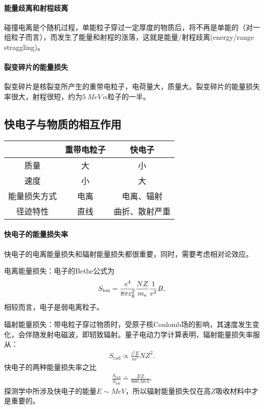 \paragraph{能量歧离和射程歧离}
碰撞电离是个随机过程，单能粒子穿过一定厚度的物质后，将不再是单能的（对一组粒子而言），而发生了能量和射程的涨落，这就是能量/射程歧离(energy/range straggling)。
\paragraph{裂变碎片的能量损失}
裂变碎片是核裂变所产生的重带电粒子，电荷量大，质量大。裂变碎片的能量损失率很大，射程很短，约为$\SI{5}{MeV}\,\alpha$粒子的一半。
\subsection{快电子与物质的相互作用}
\begin{center}
	\begin{tabular}{ccc}
		\toprule
		&重带电粒子&快电子\\
		\midrule
		质量&大&小\\
		速度&小&大\\
		能量损失方式&电离&电离、辐射\\
		径迹特性&直线&曲折、散射严重\\
		\bottomrule
	\end{tabular}
\end{center}
\paragraph{快电子的能量损失率}
快电子的电离能量损失和辐射能量损失都很重要，同时，需要考虑相对论效应。

电离能量损失：电子的Bethe公式为
\begin{align}
	S_{\mathrm{ion}}=\frac{e^4}{8\pi\varepsilon_0^2}\frac{NZ}{m_\mathrm e}\frac{1}{v^2}B,
\end{align}
相较而言，电子是弱电离粒子。

辐射能量损失：带电粒子穿过物质时，受原子核Coulomb场的影响，其速度发生变化，会伴随发射电磁波，即轫致辐射。量子电动力学计算表明，辐射能量损失率服从：
\begin{align}
	S_{\mathrm{rad}}\propto\frac{z^2E}{m^2}NZ^2.
\end{align}
快电子的两种能量损失率之比
\begin{align}
	\frac{S_{\mathrm{rad}}}{S_{\mathrm{ion}}}\doteq\frac{EZ}{\SI{800}{MeV}}.
\end{align}
探测学中所涉及快电子的能量$E\sim\si{MeV}$，所以辐射能量损失仅在高$Z$吸收材料中才是重要的。

